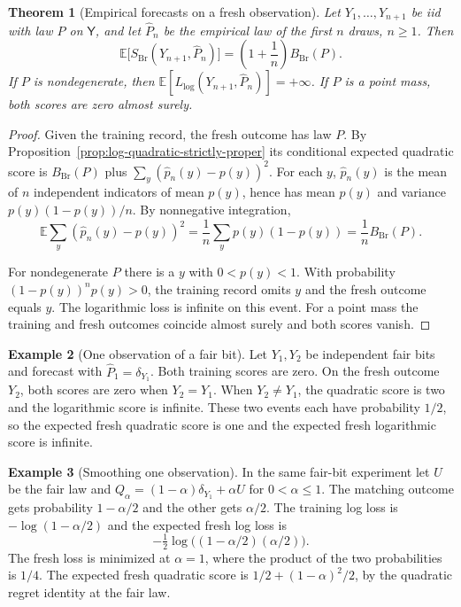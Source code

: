 \documentclass[11pt,oneside]{book}
\newtheorem{theorem}{Theorem}[chapter]
\theoremstyle{definition}
\newtheorem{example}[theorem]{Example}
\theoremstyle{remark}
\begin{document}
\begin{theorem}[Empirical forecasts on a fresh observation]
\label{thm:empirical-score-fresh-observation}
Let $Y_1,\ldots,Y_{n+1}$ be iid with law $P$ on $\mathsf Y$,
and let $\widehat P_n$ be the empirical law of the first $n$ draws,
$n\geq1$. Then
\[
\mathbb E\bigl[S_{\mathrm{Br}}(Y_{n+1},\widehat P_n)\bigr]
=\left(1+\frac1n\right)B_{\mathrm{Br}}(P).
\]
If $P$ is nondegenerate, then
$\mathbb E[L_{\log}(Y_{n+1},\widehat P_n)]=+\infty$.
If $P$ is a point mass, both scores are zero almost surely.
\end{theorem}
\begin{proof}
Given the training record, the fresh outcome has law $P$.
By Proposition~\ref{prop:log-quadratic-strictly-proper} its
conditional expected quadratic score is $B_{\mathrm{Br}}(P)$
plus $\sum_y(\widehat p_n(y)-p(y))^2$. For each $y$,
$\widehat p_n(y)$ is the mean of $n$ independent indicators
of mean $p(y)$, hence has mean $p(y)$ and variance $p(y)(1-p(y))/n$.
By nonnegative integration,
\[
\mathbb E\sum_y(\widehat p_n(y)-p(y))^2
=\frac1n\sum_y p(y)(1-p(y))
=\frac1n B_{\mathrm{Br}}(P).
\]

For nondegenerate $P$ there is a $y$ with $0<p(y)<1$.
With probability $(1-p(y))^n p(y)>0$, the training record omits
$y$ and the fresh outcome equals $y$. The logarithmic loss is
infinite on this event. For a point mass the training and fresh
outcomes coincide almost surely and both scores vanish.
\end{proof}

\begin{example}[One observation of a fair bit]
\label{ex:proper-scores-one-fair-observation}
Let $Y_1,Y_2$ be independent fair bits and forecast with
$\widehat P_1=\delta_{Y_1}$. Both training scores are zero.
On the fresh outcome $Y_2$, both scores are zero when $Y_2=Y_1$.
When $Y_2\ne Y_1$, the quadratic score is two and the logarithmic
score is infinite. These two events each have probability $1/2$,
so the expected fresh quadratic score is one and the expected fresh
logarithmic score is infinite.
\end{example}

\begin{example}[Smoothing one observation]
\label{ex:proper-scores-smoothed-fair-observation}
In the same fair-bit experiment let $U$ be the fair law and
$Q_\alpha=(1-\alpha)\delta_{Y_1}+\alpha U$ for $0<\alpha\leq1$.
The matching outcome gets probability $1-\alpha/2$ and the other
gets $\alpha/2$. The training log loss is $-\log(1-\alpha/2)$
and the expected fresh log loss is
\[
-\tfrac12\log\bigl((1-\alpha/2)(\alpha/2)\bigr).
\]
The fresh loss is minimized at $\alpha=1$, where the product
of the two probabilities is $1/4$. The expected fresh quadratic
score is $1/2+(1-\alpha)^2/2$, by the quadratic regret identity
at the fair law.
\end{example}
\end{document}
